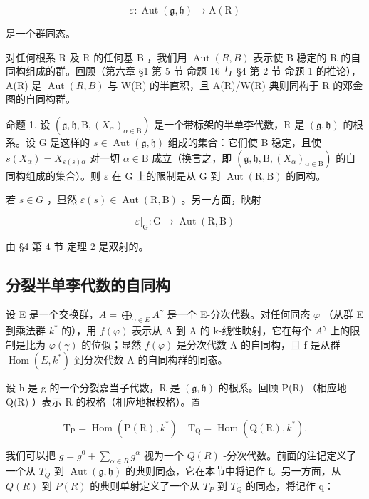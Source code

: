 \[
\varepsilon : \operatorname{Aut} (\mathfrak {g}, \mathfrak {h}) \to \mathrm{A} (\mathrm{R})
\]

是一个群同态。

对任何根系 R 及 R 的任何基 B ，我们用 \(\operatorname{Aut}(R,B)\) 表示使 B 稳定的 R 的自同构组成的群。回顾（第六章 §1 第 5 节 命题 16 与 §4 第 2 节 命题 1 的推论），A(R) 是 \(\operatorname{Aut}(R,B)\) 与 W(R) 的半直积，且 A(R)/W(R) 典则同构于 R 的邓金图的自同构群。

命题 1. 设 \((\mathfrak{g},\mathfrak{h},\mathrm{B},(X_{\alpha})_{\alpha \in \mathrm{B}})\) 是一个带标架的半单李代数，R 是 \((\mathfrak{g},\mathfrak{h})\) 的根系。设 G 是这样的 \(s\in \operatorname {Aut}(\mathfrak{g},\mathfrak{h})\) 组成的集合：它们使 B 稳定，且使 \(s(X_{\alpha}) = X_{\varepsilon (s)\alpha}\) 对一切 \(\alpha \in \mathrm{B}\) 成立（换言之，即 \((\mathfrak{g},\mathfrak{h},\mathrm{B},(X_{\alpha})_{\alpha \in \mathrm{B}})\) 的自同构组成的集合）。则 \(\varepsilon\) 在 \(\mathrm{G}\) 上的限制是从 \(\mathrm{G}\) 到 \(\operatorname {Aut}(\mathrm{R},\mathrm{B})\) 的同构。

若 \(s \in G\) ，显然 \(\varepsilon(s) \in \operatorname{Aut}(\mathrm{R}, \mathrm{B})\) 。另一方面，映射

\[
\varepsilon|_{\mathrm{G}}: \mathrm{G} \rightarrow \operatorname{Aut} (\mathrm{R}, \mathrm{B})
\]

由 §4 第 4 节 定理 2 是双射的。

\subsection{分裂半单李代数的自同构}

设 E 是一个交换群，\(A = \bigoplus_{\gamma \in E} A^{\gamma}\) 是一个 E-分次代数。对任何同态 \(\varphi\) （从群 E 到乘法群 \(k^{*}\) 的），用 \(f(\varphi)\) 表示从 A 到 A 的 k-线性映射，它在每个 \(A^{\gamma}\) 上的限制是比为 \(\varphi(\gamma)\) 的位似；显然 \(f(\varphi)\) 是分次代数 A 的自同构，且 f 是从群 \(\operatorname{Hom}(E, k^{*})\) 到分次代数 A 的自同构群的同态。

设 h 是 g 的一个分裂嘉当子代数，R 是 \((\mathfrak{g}, \mathfrak{h})\) 的根系。回顾 P(R) （相应地 Q(R) ）表示 R 的权格（相应地根权格）。置

\[
\mathrm{T} _ {\mathrm{P}} = \operatorname{Hom} (\mathrm{P} (\mathrm{R}), k ^ {*}) \quad \mathrm{T} _ {\mathrm{Q}} = \operatorname{Hom} (\mathrm{Q} (\mathrm{R}), k ^ {*}).
\]

我们可以把 \(g = g^{0} + \sum_{\alpha \in R} g^{\alpha}\) 视为一个 \(Q(R)\) -分次代数。前面的注记定义了一个从 \(T_{Q}\) 到 \(\operatorname{Aut}(\mathfrak{g}, \mathfrak{h})\) 的典则同态，它在本节中将记作 f。另一方面，从 \(Q(R)\) 到 \(P(R)\) 的典则单射定义了一个从 \(T_{P}\) 到 \(T_{Q}\) 的同态，将记作 q：


